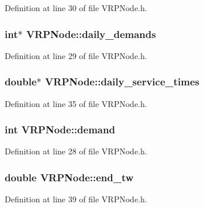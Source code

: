 Definition at line 30 of file VRPNode.h.

\hypertarget{class_v_r_p_node_a0ccb1affe2876d292a7a64246a29a803}{
\subsubsection[{daily\_\-demands}]{\setlength{\rightskip}{0pt plus 5cm}int$\ast$ {\bf VRPNode::daily\_\-demands}}}
\label{class_v_r_p_node_a0ccb1affe2876d292a7a64246a29a803}


Definition at line 29 of file VRPNode.h.

\hypertarget{class_v_r_p_node_a73ee95bbf4e7c5378e26fa473b568627}{
\subsubsection[{daily\_\-service\_\-times}]{\setlength{\rightskip}{0pt plus 5cm}double$\ast$ {\bf VRPNode::daily\_\-service\_\-times}}}
\label{class_v_r_p_node_a73ee95bbf4e7c5378e26fa473b568627}


Definition at line 35 of file VRPNode.h.

\hypertarget{class_v_r_p_node_a87e5e877816902bb1e21698ff0be26ac}{
\subsubsection[{demand}]{\setlength{\rightskip}{0pt plus 5cm}int {\bf VRPNode::demand}}}
\label{class_v_r_p_node_a87e5e877816902bb1e21698ff0be26ac}


Definition at line 28 of file VRPNode.h.

\hypertarget{class_v_r_p_node_a2ffafc22b3e6315d8796f3bbed964b19}{
\subsubsection[{end\_\-tw}]{\setlength{\rightskip}{0pt plus 5cm}double {\bf VRPNode::end\_\-tw}}}
\label{class_v_r_p_node_a2ffafc22b3e6315d8796f3bbed964b19}


Definition at line 39 of file VRPNode.h.

